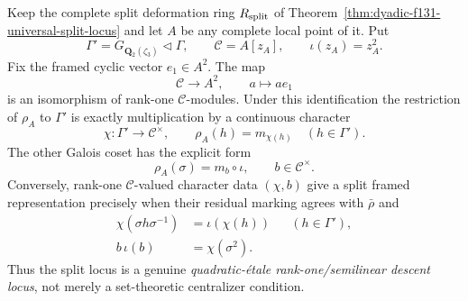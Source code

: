 \begin{theorem}
\label{thm:dyadic-f131-toric-semilinear-description}
Keep the complete split
deformation ring
$R_{\rm split}$ of
Theorem~\ref{thm:dyadic-f131-universal-split-locus}
and let $A$ be any
complete local point of it.
Put
\[
\Gamma'=
G_{\mathbf Q_2(\zeta_3)}
\triangleleft\Gamma,\qquad
\mathcal C=A[z_A],\qquad
\iota(z_A)=z_A^2.
\]
Fix the framed cyclic
vector $e_1\in A^2$.
The map
\[
\mathcal C\longrightarrow A^2,
\qquad a\longmapsto a e_1
\]
is an isomorphism
of rank-one
$\mathcal C$-modules.
Under this identification
the restriction of $\rho_A$
to $\Gamma'$ is exactly
multiplication by a
continuous character
\begin{equation}\label{eq:dyadic-f131-toric-character}
\chi:\Gamma'\longrightarrow\mathcal C^\times,
\qquad
\rho_A(h)=m_{\chi(h)}
\quad(h\in\Gamma').
\end{equation}
The other Galois coset
has the explicit form
\begin{equation}\label{eq:dyadic-f131-semilinear-sigma}
\rho_A(\sigma)=m_b\circ\iota,
\qquad b\in\mathcal C^\times.
\end{equation}
Conversely, rank-one
$\mathcal C$-valued
character data $(\chi,b)$
give a split framed
representation precisely
when their residual
marking agrees with
$\bar\rho$ and
\begin{equation}\label{eq:dyadic-f131-semilinear-character-conditions}
\boxed{
\begin{aligned}
\chi(\sigma h\sigma^{-1})
 &=\iota(\chi(h))
 &&(h\in\Gamma'),\\
b\,\iota(b)&=\chi(\sigma^2).
\end{aligned}}
\end{equation}
Thus the split locus
is a genuine
\emph{quadratic-étale
rank-one/semilinear
descent locus},
not merely a
set-theoretic
centralizer condition.


\end{theorem}
